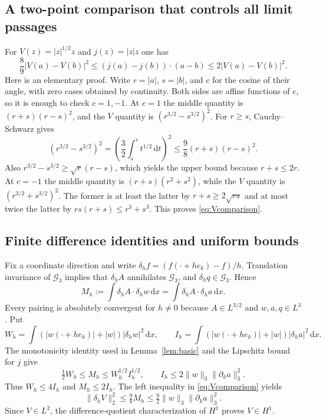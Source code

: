 \documentclass[11pt,a4paper]{article}
\theoremstyle{definition}\newtheorem{definition}[theorem]{Definition}
\theoremstyle{remark}\newtheorem{remark}[theorem]{Remark}
\newcommand{\G}{\mathcal G_3}
\newcommand{\dd}{\,\mathrm d}
\newcommand{\norm}[1]{\lVert #1\rVert}
\numberwithin{equation}{section}
\begin{document}
\subsection{A two-point comparison that controls all limit passages}
For $V(z)=|z|^{1/2}z$ and $j(z)=|z|z$ one has
\begin{equation}\label{eq:Vcomparison}
 \frac89|V(a)-V(b)|^2
 \le(j(a)-j(b))\cdot(a-b)
 \le2|V(a)-V(b)|^2.
\end{equation}
Here is an elementary proof. Write $r=|a|$, $s=|b|$, and $c$ for the cosine of their angle, with zero cases obtained by continuity. Both sides are affine functions of $c$, so it is enough to check $c=1,-1$. At $c=1$ the middle quantity is $(r+s)(r-s)^2$, and the $V$ quantity is $(r^{3/2}-s^{3/2})^2$. For $r\ge s$, Cauchy--Schwarz gives
\[
 (r^{3/2}-s^{3/2})^2
 =\left(\frac32\int_s^r t^{1/2}\dd t\right)^2
 \le\frac98(r+s)(r-s)^2.
\]
Also $r^{3/2}-s^{3/2}\ge\sqrt r(r-s)$, which yields the upper bound because $r+s\le2r$. At $c=-1$ the middle quantity is $(r+s)(r^2+s^2)$, while the $V$ quantity is $(r^{3/2}+s^{3/2})^2$. The former is at least the latter by $r+s\ge2\sqrt{rs}$ and at most twice the latter by $rs(r+s)\le r^3+s^3$. This proves \eqref{eq:Vcomparison}.

\subsection{Finite difference identities and uniform bounds}
Fix a coordinate direction and write $\delta_h f=(f(\cdot+he_k)-f)/h$. Translation invariance of $\G$ implies that $\delta_hA$ annihilates $\G$, and $\delta_hq\in\G$. Hence
\begin{equation}\label{eq:finiteidentity}
 M_h:=\int\delta_hA\cdot\delta_hw\dd x
     =\int\delta_hA\cdot\delta_ha\dd x.
\end{equation}
Every pairing is absolutely convergent for $h\ne0$ because $A\in L^{3/2}$ and $w,a,q\in L^3$. Put
\[
 W_h=\int(|w(\cdot+he_k)|+|w|)|\delta_hw|^2\dd x,\qquad
 I_h=\int(|w(\cdot+he_k)|+|w|)|\delta_ha|^2\dd x.
\]
The monotonicity identity used in Lemma~\ref{lem:basic} and the Lipschitz bound for $j$ give
\begin{equation}\label{eq:MhWh}
 \tfrac12W_h\le M_h\le W_h^{1/2}I_h^{1/2},\qquad
 I_h\le2\norm w_3\norm{\partial_ka}_3^2.
\end{equation}
Thus $W_h\le4I_h$ and $M_h\le2I_h$. The left inequality in \eqref{eq:Vcomparison} yields
\[
 \norm{\delta_hV}_2^2\le\tfrac98M_h
 \le\tfrac92\norm w_3\norm{\partial_ka}_3^2.
\]
Since $V\in L^2$, the difference-quotient characterization of $H^1$ proves $V\in H^1$.
\end{document}
